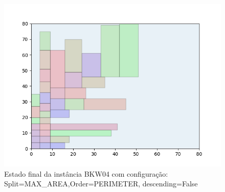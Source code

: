 \begin{figure}[H]
    \centering
    \caption[]{Estado final da instância BKW04 com configuração: Split=MAX_AREA,Order=PERIMETER, descending=False}
    \label{fig:bkw04-max_area-perimeter-false}
    \includegraphics[scale=0.5]{output/figures/bkw/bkw04/max_area/perimeter/false/00}
\end{figure}